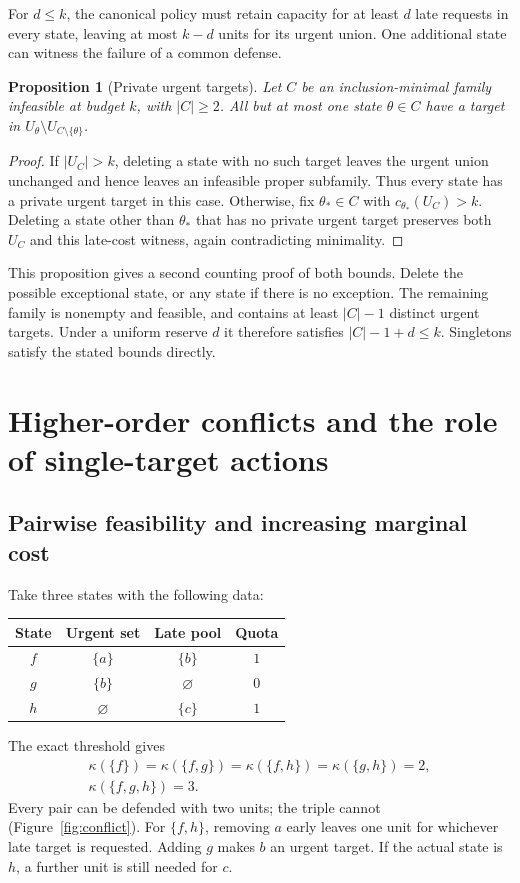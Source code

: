 \documentclass[11pt,a4paper]{amsart}
\newtheorem{proposition}[theorem]{Proposition}
\theoremstyle{definition}
\theoremstyle{remark}
\newcommand{\card}[1]{\lvert #1\rvert}
\begin{document}
For $d\le k$, the canonical policy must retain capacity for at least $d$
late requests in every state, leaving at most $k-d$ units for its urgent
union. One additional state can witness the failure of a common defense.

\begin{proposition}[Private urgent targets]\label{prop:private}
Let $C$ be an inclusion-minimal family infeasible at budget $k$, with
$\card C\ge2$. All but at most one state $\theta\in C$ have a target in
$U_\theta\setminus U_{C\setminus\{\theta\}}$.
\end{proposition}
\begin{proof}
If $\card{U_C}>k$, deleting a state with no such target leaves the urgent
union unchanged and hence leaves an infeasible proper subfamily.
Thus every state has a private urgent target in this case.
Otherwise, fix $\theta_*\in C$ with $c_{\theta_*}(U_C)>k$.
Deleting a state other than $\theta_*$ that has no private urgent target
preserves both $U_C$ and this late-cost witness, again contradicting
minimality.
\end{proof}

This proposition gives a second counting proof of both bounds. Delete
the possible exceptional state, or any state if there is no exception.
The remaining family is nonempty and feasible, and contains at least
$\card C-1$ distinct urgent targets. Under a uniform reserve $d$ it
therefore satisfies $\card C-1+d\le k$. Singletons satisfy the stated
bounds directly.

\section{Higher-order conflicts and the role of single-target actions}

\subsection{Pairwise feasibility and increasing marginal cost}
Take three states with the following data:
\begin{center}
\begin{tabular}{cccc}
\toprule
State & Urgent set & Late pool & Quota\\
\midrule
$f$ & $\{a\}$ & $\{b\}$ & $1$\\
$g$ & $\{b\}$ & $\varnothing$ & $0$\\
$h$ & $\varnothing$ & $\{c\}$ & $1$\\
\bottomrule
\end{tabular}
\end{center}
The exact threshold gives
\begin{equation}\label{eq:triple}
\begin{gathered}
\kappa(\{f\})=\kappa(\{f,g\})=\kappa(\{f,h\})
=\kappa(\{g,h\})=2,\\
\kappa(\{f,g,h\})=3.
\end{gathered}
\end{equation}
Every pair can be defended with two units; the triple cannot
(Figure~\ref{fig:conflict}). For $\{f,h\}$, removing $a$ early leaves one
unit for whichever late target is requested. Adding $g$ makes $b$ an urgent
target. If the actual state is $h$, a further unit is still needed for $c$.
\end{document}
